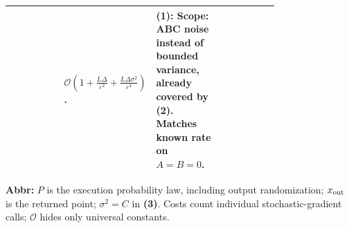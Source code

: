 \begin{table}[tp]
\begin{threeparttable}
\begin{tabularx}{\linewidth}{@{}>{\raggedright\arraybackslash}p{0.20\linewidth}>{\raggedright\arraybackslash}p{0.32\linewidth}>{\raggedright\arraybackslash}p{0.25\linewidth}>{\raggedright\arraybackslash}X@{}}
& $\mathcal{O}\!\left(1+\frac{L\Delta}{\varepsilon^2}+\frac{L\Delta\sigma^2}{\varepsilon^4}\right)$.
& \textbf{(1)}: Scope: ABC noise instead of bounded variance, already covered by \textbf{(2)}. Matches known rate on $A=B=0$.
& \\
\bottomrule
\end{tabularx}
\begin{tablenotes}[flushleft]\footnotesize
\item[] \textbf{Abbr:} $P$ is the execution probability law, including output randomization; $x_{\rm out}$ is the returned point; $\sigma^2=C$ in \textbf{(3)}. Costs count individual stochastic-gradient calls; $\mathcal{O}$ hides only universal constants.
\end{tablenotes}
\end{threeparttable}
\end{table}
\clearpage
